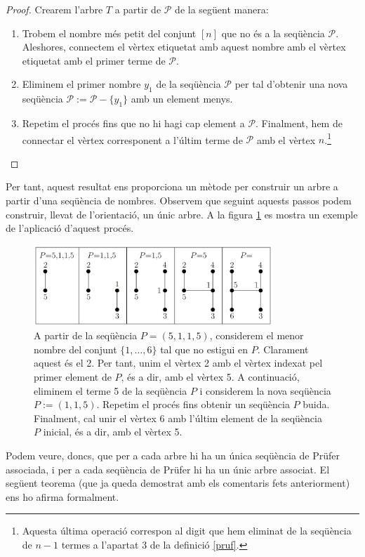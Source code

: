 \documentclass{article}
\begin{document}
\begin{proof}
Crearem l'arbre $T$ a partir de $\mathcal{P}$ de la següent manera:
\begin{enumerate}
    \item Trobem el nombre més petit del conjunt $[n]$ que no és a la seqüència $\mathcal{P}$. Aleshores, connectem el vèrtex etiquetat amb aquest nombre amb el vèrtex etiquetat amb el primer terme de $\mathcal{P}$.
    \item Eliminem el primer nombre $y_1$ de la seqüència $\mathcal{P}$ per tal d'obtenir una nova seqüència $\mathcal{P}:=\mathcal{P}-\{y_1\}$ amb un element menys. 
    \item Repetim el procés fins que no hi hagi cap element a $\mathcal{P}$. Finalment, hem de connectar el vèrtex corresponent a l'últim terme de $\mathcal{P}$ amb el vèrtex $n$.\footnote{Aquesta última operació correspon al digit que hem eliminat de la seqüència de $n-1$ termes a l'apartat 3 de la definició \ref{pruf}.} \cite{3}
\end{enumerate}
\end{proof}
Per tant, aquest resultat ens proporciona un mètode per construir un arbre a partir d'una seqüència de nombres. Observem que seguint aquests passos podem construir, llevat de l'orientació, un únic arbre. A la figura \ref{pruf2} es mostra un exemple de l'aplicació d'aquest procés.\par 
\begin{figure}[H]
   \centering
   \includegraphics[width=9cm]{imatges/prufer2.jpg}
   \caption{A partir de la seqüència $P=(5,1,1,5)$, considerem el menor nombre del conjunt $\{1,\ldots,6\}$ tal que no estigui en $P$. Clarament aquest és el 2. Per tant, unim el vèrtex 2 amb el vèrtex indexat pel primer element de $P$, és a dir, amb el vèrtex 5. A continuació, eliminem el terme 5 de la seqüència $P$ i considerem la nova seqüència $P:=(1,1,5)$. Repetim el procés fins obtenir un seqüència $P$ buida. Finalment, cal unir el vèrtex 6 amb l'últim element de la seqüència $P$ inicial, és a dir, amb el vèrtex 5. \cite{3}}
   \label{pruf2}
\end{figure}
Podem veure, doncs, que per a cada arbre hi ha un única seqüència de Prüfer associada, i per a cada seqüència de Prüfer hi ha un únic arbre associat. El següent teorema (que ja queda demostrat amb els comentaris fets anteriorment) ens ho afirma formalment.
\end{document}
